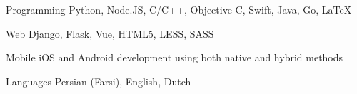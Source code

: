 

\begin{cvskills}

  \cvskill
    {Programming} %
    {Python, Node.JS, C/C++, Objective-C, Swift, Java, Go, LaTeX} %

  \cvskill
    {Web} %
    {Django, Flask, Vue, HTML5, LESS, SASS} %

  \cvskill
    {Mobile} %
    {iOS and Android development using both native and hybrid methods} %

  \cvskill
    {Languages} %
    {Persian (Farsi), English, Dutch} %

\end{cvskills}
